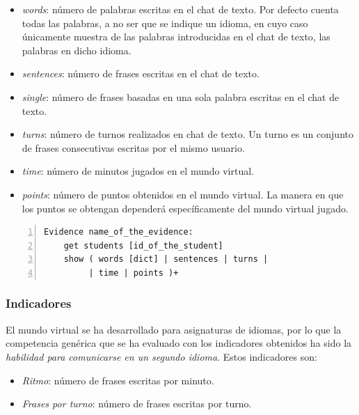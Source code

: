 \begin{itemize}
\item \emph{words}: número de palabras escritas en el chat de texto. Por defecto cuenta todas las palabras, a no ser que se indique un idioma, en cuyo caso únicamente muestra de las palabras introducidas en el chat de texto, las palabras en dicho idioma.
\item \emph{sentences}: número de frases escritas en el chat de texto.
\item \emph{single}: número de frases basadas en una sola palabra escritas en el chat de texto.
\item \emph{turns}: número de turnos realizados en chat de texto. Un turno es un conjunto de frases consecutivas escritas por el mismo usuario.
\item \emph{time}: número de minutos jugados en el mundo virtual.
\item \emph{points}: número de puntos obtenidos en el mundo virtual. La manera en que los puntos se obtengan dependerá específicamente del mundo virtual jugado.
\end{itemize}

\begin{lstlisting}[caption=Palabras reservadas y formato de VWQL (version 0.1), label=code:reserved,numbers=left, captionpos=b, morekeywords={Evidence,get, students, show, words, sentences, turns, time, points}]
Evidence name_of_the_evidence:
    get students [id_of_the_student]
    show ( words [dict] | sentences | turns |
         | time | points )+
\end{lstlisting}

\subsubsection{Indicadores}

El mundo virtual se ha desarrollado para asignaturas de idiomas, por lo que la competencia genérica que se ha evaluado con los indicadores obtenidos ha sido la \emph{habilidad para comunicarse en un segundo idioma}. Estos indicadores son:


\begin{itemize}
\item \emph{Ritmo}: número de frases escritas por minuto.
\item \emph{Frases por turno}: número de frases escritas por turno.
\end{itemize}

